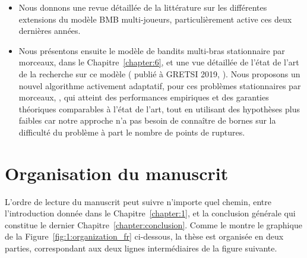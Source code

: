 \begin{resume_fr}
\begin{itemize}
    \item
    Nous donnons une revue détaillée de la littérature sur les différentes extensions du modèle BMB multi-joueurs, particulièrement active ces deux dernières années.

    \item
    Nous présentons ensuite le modèle de bandits multi-bras stationnaire par morceaux, dans le Chapitre~\ref{chapter:6}, et une vue détaillée de l'état de l'art de la recherche sur ce modèle (\cite{Besson2019Gretsi} publié à GRETSI 2019, \cite{Besson2019GLRT}).
    Nous proposons un nouvel algorithme activement adaptatif, pour ces problèmes stationnaires par morceaux, \GLRklUCB, qui atteint des performances empiriques et des garanties théoriques comparables à l'état de l'art, tout en utilisant des hypothèses plus faibles car notre approche n'a pas besoin de connaître de bornes sur la difficulté du problème à part le nombre de points de ruptures.

\end{itemize}

\section*{Organisation du manuscrit}

%
L'ordre de lecture du manuscrit peut suivre n'importe quel chemin, entre l'introduction donnée dans le Chapitre~\ref{chapter:1}, et la conclusion générale qui constitue le dernier Chapitre~\ref{chapter:conclusion}.
Comme le montre le graphique de la Figure~\ref{fig:1:organization_fr} ci-dessous,
la thèse est organisée en deux parties, correspondant aux deux lignes intermédiaires de la figure suivante.


\end{resume_fr}
